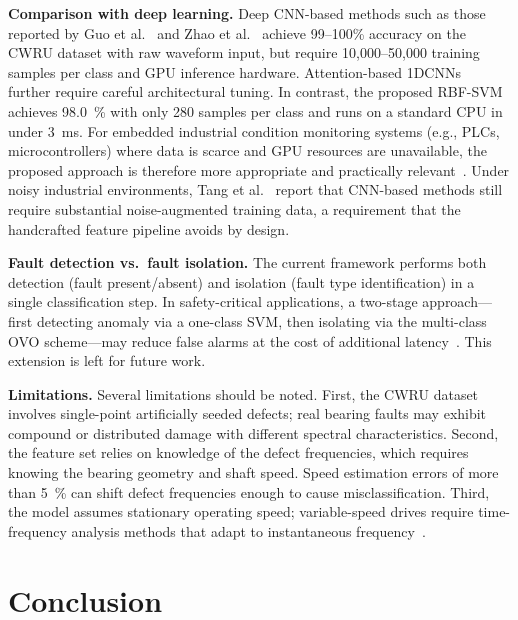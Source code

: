 \documentclass[conference,a4paper]{IEEEtran}[2015/08/26]
\begin{document}
\textbf{Comparison with deep learning.}
Deep CNN-based methods such as those reported by Guo et
al.~\cite{Guo2016} and Zhao et al.~\cite{Zhao2019} achieve 99--100\%
accuracy on the CWRU dataset with raw waveform input, but require
10,000--50,000 training samples per class and GPU inference hardware.
Attention-based 1DCNNs~\cite{Wang2019} further require careful
architectural tuning. In contrast, the proposed RBF-SVM achieves
\SI{98.0}{\percent} with only 280 samples per class and runs on a
standard CPU in under \SI{3}{\milli\second}. For embedded industrial
condition monitoring systems (e.g., PLCs, microcontrollers) where
data is scarce and GPU resources are unavailable, the proposed
approach is therefore more appropriate and practically
relevant~\cite{Liu2018,Widodo2007}. Under noisy industrial
environments, Tang et al.~\cite{Tang2020} report that CNN-based
methods still require substantial noise-augmented training data,
a requirement that the handcrafted feature pipeline avoids by design.

\textbf{Fault detection vs.\ fault isolation.}
The current framework performs both detection (fault present/absent)
and isolation (fault type identification) in a single classification
step. In safety-critical applications, a two-stage approach---first
detecting anomaly via a one-class SVM, then isolating via the
multi-class OVO scheme---may reduce false alarms at the cost of
additional latency~\cite{Vapnik1998}. This extension is left
for future work.

\textbf{Limitations.}
Several limitations should be noted. First, the CWRU dataset involves
single-point artificially seeded defects; real bearing faults may
exhibit compound or distributed damage with different spectral
characteristics. Second, the feature set relies on knowledge of the
defect frequencies, which requires knowing the bearing geometry and
shaft speed. Speed estimation errors of more than \SI{5}{\percent}
can shift defect frequencies enough to cause misclassification.
Third, the model assumes stationary operating speed; variable-speed
drives require time-frequency analysis methods that adapt to
instantaneous frequency~\cite{Huang1998,Yan2014}.

\section{Conclusion}
\label{sec:conclusion}
\end{document}
